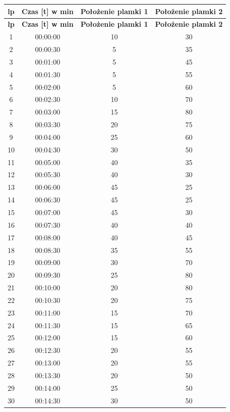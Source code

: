 \documentclass[a4paper,12pt]{article}
\begin{document}
\begin{longtable}{|c|c|c|c|}
\hline
\textbf{lp} & \textbf{Czas [t] w min} & \textbf{Położenie plamki 1} & \textbf{Położenie plamki 2} \\
\hline
\endfirsthead
\hline
\textbf{lp} & \textbf{Czas [t] w min} & \textbf{Położenie plamki 1} & \textbf{Położenie plamki 2} \\
\hline
\endhead
1 & 00:00:00 & 10 & 30 \\ \hline
2 & 00:00:30 & 5  & 35 \\ \hline
3 & 00:01:00 & 5  & 45 \\ \hline
4 & 00:01:30 & 5  & 55 \\ \hline
5 & 00:02:00 & 5  & 60 \\ \hline
6 & 00:02:30 & 10 & 70 \\ \hline
7 & 00:03:00 & 15 & 80 \\ \hline
8 & 00:03:30 & 20 & 75 \\ \hline
9 & 00:04:00 & 25 & 60 \\ \hline
10 & 00:04:30 & 30 & 50 \\ \hline
11 & 00:05:00 & 40 & 35 \\ \hline
12 & 00:05:30 & 40 & 30 \\ \hline
13 & 00:06:00 & 45 & 25 \\ \hline
14 & 00:06:30 & 45 & 25 \\ \hline
15 & 00:07:00 & 45 & 30 \\ \hline
16 & 00:07:30 & 40 & 40 \\ \hline
17 & 00:08:00 & 40 & 45 \\ \hline
18 & 00:08:30 & 35 & 55 \\ \hline
19 & 00:09:00 & 30 & 70 \\ \hline
20 & 00:09:30 & 25 & 80 \\ \hline
21 & 00:10:00 & 20 & 80 \\ \hline
22 & 00:10:30 & 20 & 75 \\ \hline
23 & 00:11:00 & 15 & 70 \\ \hline
24 & 00:11:30 & 15 & 65 \\ \hline
25 & 00:12:00 & 15 & 60 \\ \hline
26 & 00:12:30 & 20 & 55 \\ \hline
27 & 00:13:00 & 20 & 55 \\ \hline
28 & 00:13:30 & 20 & 50 \\ \hline
29 & 00:14:00 & 25 & 50 \\ \hline
30 & 00:14:30 & 30 & 50 \\ \hline

\end{longtable}
\end{document}
